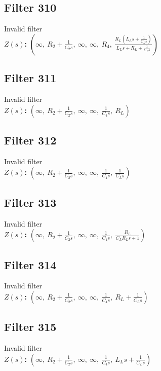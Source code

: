\documentclass{article}
\begin{document}
\subsection*{Filter 310}
Invalid filter \\ 
\textbf{$Z(s)$:} $\left( \infty, \  R_{2} + \frac{1}{C_{2} s}, \  \infty, \  \infty, \  R_{4}, \  \frac{R_{L} \left(L_{L} s + \frac{1}{C_{L} s}\right)}{L_{L} s + R_{L} + \frac{1}{C_{L} s}}\right)$ \\ 
\subsection*{Filter 311}
Invalid filter \\ 
\textbf{$Z(s)$:} $\left( \infty, \  R_{2} + \frac{1}{C_{2} s}, \  \infty, \  \infty, \  \frac{1}{C_{4} s}, \  R_{L}\right)$ \\ 
\subsection*{Filter 312}
Invalid filter \\ 
\textbf{$Z(s)$:} $\left( \infty, \  R_{2} + \frac{1}{C_{2} s}, \  \infty, \  \infty, \  \frac{1}{C_{4} s}, \  \frac{1}{C_{L} s}\right)$ \\ 
\subsection*{Filter 313}
Invalid filter \\ 
\textbf{$Z(s)$:} $\left( \infty, \  R_{2} + \frac{1}{C_{2} s}, \  \infty, \  \infty, \  \frac{1}{C_{4} s}, \  \frac{R_{L}}{C_{L} R_{L} s + 1}\right)$ \\ 
\subsection*{Filter 314}
Invalid filter \\ 
\textbf{$Z(s)$:} $\left( \infty, \  R_{2} + \frac{1}{C_{2} s}, \  \infty, \  \infty, \  \frac{1}{C_{4} s}, \  R_{L} + \frac{1}{C_{L} s}\right)$ \\ 
\subsection*{Filter 315}
Invalid filter \\ 
\textbf{$Z(s)$:} $\left( \infty, \  R_{2} + \frac{1}{C_{2} s}, \  \infty, \  \infty, \  \frac{1}{C_{4} s}, \  L_{L} s + \frac{1}{C_{L} s}\right)$ \\ 
\end{document}
